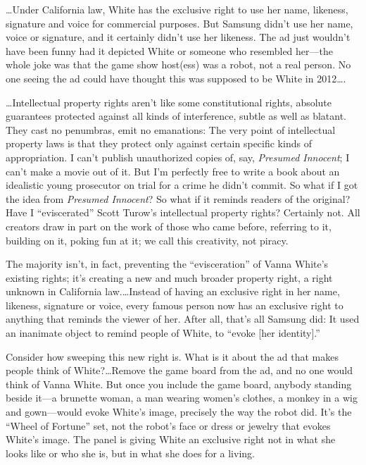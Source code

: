 
\dots Under California law, White has the exclusive right to use her name,
likeness, signature and voice for commercial purposes. But Samsung didn't use
her name, voice or signature, and it certainly didn't use her likeness. The ad
just wouldn't have been funny had it depicted White or someone who resembled
her---the whole joke was that the game show host(ess) was a robot, not a real
person. No one seeing the ad could have thought this was supposed to be White
in 2012\dots.


\dots Intellectual property rights aren't like some constitutional rights,
absolute guarantees protected against all kinds of interference, subtle as well
as blatant. They cast no penumbras, emit no emanations: The very point of
intellectual property laws is that they protect only against certain specific
kinds of appropriation. I can't publish unauthorized copies of, say,
\textit{Presumed Innocent}; I can't make a movie out of it. But I'm perfectly
free to write a book about an idealistic young prosecutor on trial for a crime
he didn't commit. So what if I got the idea from \textit{Presumed Innocent}? So
what if it reminds readers of the original? Have I ``eviscerated'' Scott
Turow's intellectual property rights? Certainly not. All creators draw in part
on the work of those who came before, referring to it, building on it, poking
fun at it; we call this creativity, not piracy.

The majority isn't, in fact, preventing the ``evisceration'' of Vanna White's
existing rights; it's creating a new and much broader property right, a right
unknown in California law.\dots Instead of having an exclusive right in her
name, likeness, signature or voice, every famous person now has an exclusive
right to anything that reminds the viewer of her. After all, that's all Samsung
did: It used an inanimate object to remind people of White, to ``evoke [her
identity].''

Consider how sweeping this new right is. What is it about the ad that makes
people think of White?\dots Remove the game board from the ad, and no one
would think of Vanna White. But once you include the game board, anybody
standing beside it---a brunette woman, a man wearing women's clothes, a monkey
in a wig and gown---would evoke White's image, precisely the way the robot
did. It's the ``Wheel of Fortune'' set, not the robot's face or dress or
jewelry that evokes White's image. The panel is giving White an exclusive right
not in what she looks like or who she is, but in what she does for a living.

